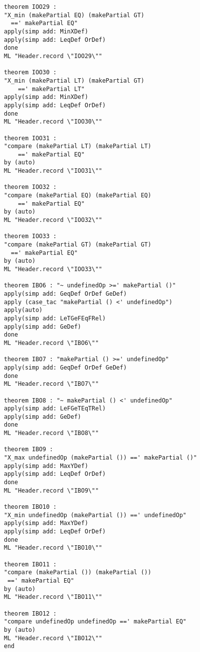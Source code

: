 \begin{multicols}{2}
\begin{Verbatim}
theorem IOO29 :
"X_min (makePartial EQ) (makePartial GT)
  ==' makePartial EQ"
apply(simp add: MinXDef)
apply(simp add: LeqDef OrDef)
done
ML "Header.record \"IOO29\""

theorem IOO30 :
"X_min (makePartial LT) (makePartial GT) 
    ==' makePartial LT"
apply(simp add: MinXDef)
apply(simp add: LeqDef OrDef)
done
ML "Header.record \"IOO30\""

theorem IOO31 :
"compare (makePartial LT) (makePartial LT) 
    ==' makePartial EQ"
by (auto)
ML "Header.record \"IOO31\""

theorem IOO32 :
"compare (makePartial EQ) (makePartial EQ) 
    ==' makePartial EQ"
by (auto)
ML "Header.record \"IOO32\""

theorem IOO33 :
"compare (makePartial GT) (makePartial GT)
  ==' makePartial EQ"
by (auto)
ML "Header.record \"IOO33\""

theorem IBO6 : "~ undefinedOp >=' makePartial ()"
apply(simp add: GeqDef OrDef GeDef)
apply (case_tac "makePartial () <' undefinedOp")
apply(auto)
apply(simp add: LeTGeFEqFRel)
apply(simp add: GeDef)
done
ML "Header.record \"IBO6\""

theorem IBO7 : "makePartial () >=' undefinedOp"
apply(simp add: GeqDef OrDef GeDef)
done
ML "Header.record \"IBO7\""

theorem IBO8 : "~ makePartial () <' undefinedOp"
apply(simp add: LeFGeTEqTRel)
apply(simp add: GeDef)
done
ML "Header.record \"IBO8\""

theorem IBO9 :
"X_max undefinedOp (makePartial ()) ==' makePartial ()"
apply(simp add: MaxYDef)
apply(simp add: LeqDef OrDef)
done
ML "Header.record \"IBO9\""

theorem IBO10 :
"X_min undefinedOp (makePartial ()) ==' undefinedOp"
apply(simp add: MaxYDef)
apply(simp add: LeqDef OrDef)
done
ML "Header.record \"IBO10\""

theorem IBO11 :
"compare (makePartial ()) (makePartial ()) 
 ==' makePartial EQ"
by (auto)
ML "Header.record \"IBO11\""

theorem IBO12 :
"compare undefinedOp undefinedOp ==' makePartial EQ"
by (auto)
ML "Header.record \"IBO12\""
end
\end{Verbatim}
\end{multicols}

